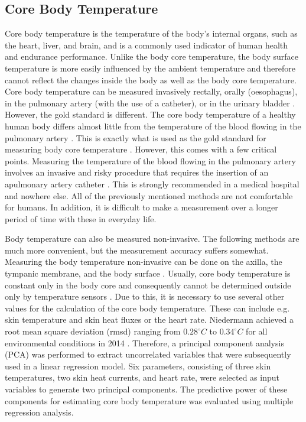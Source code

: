 \subsection{Core Body Temperature}
\label{Background:BodyTemperature:CBT}
Core body temperature is the temperature of the body's internal organs, such as the heart, liver, and brain, and is a commonly used indicator of human health and endurance performance.
Unlike the body core temperature, the body surface temperature is more easily influenced by the ambient temperature and therefore cannot reflect the changes inside the body as well as the body core temperature.
Core body temperature can be measured invasively rectally, orally (oesophagus), in the pulmonary artery (with the use of a catheter), or in the urinary bladder \cite{moranCoreTemperatureMeasurement2002a}.
However, the gold standard is different.
The core body temperature of a healthy human body differs almost little from the temperature of the blood flowing in the pulmonary artery \cite{krizanacFemoroiliacalArteryPulmonary2013, holtzclawMonitoringBodyTemperature1993}.
This is exactly what is used as the gold standard for measuring body core temperature \cite{krizanacFemoroiliacalArteryPulmonary2013, holtzclawMonitoringBodyTemperature1993, fulbrookCoreBodyTemperature1997, maxtonEstimatingCoreTemperature2004}.
However, this comes with a few critical points.
Measuring the temperature of the blood flowing in the pulmonary artery involves an invasive and risky procedure that requires the insertion of an apulmonary artery catheter \cite{yeohRevisitingTympanicMembrane2017}.
This is strongly recommended in a medical hospital and nowhere else.
All of the previously mentioned methods are not comfortable for humans. 
In addition, it is difficult to make a measurement over a longer period of time with these in everyday life.

Body temperature can also be measured non-invasive.
The following methods are much more convenient, but the measurement accuracy suffers somewhat.
Measuring the body temperature non-invasive can be done on the axilla, the tympanic membrane, and the body surface \cite{moranCoreTemperatureMeasurement2002a}.
Usually, core body temperature is constant only in the body core and consequently cannot be determined outside only by temperature sensors \cite{niedermannPredictionHumanCore2014}.
Due to this, it is necessary to use several other values for the calculation of the core body temperature. 
These can include e.g. skin temperature and skin heat fluxes or the heart rate.
Niedermann achieved a root mean square deviation (rmsd) ranging from $0.28 ^\circ C$ to $0.34 ^\circ C$ for all environmental conditions in 2014 \cite{niedermannPredictionHumanCore2014}.
Therefore, a principal component analysis (PCA) was performed to extract uncorrelated variables that were subsequently used in a linear regression model. 
Six parameters, consisting of three skin temperatures, two skin heat currents, and heart rate, were selected as input variables to generate two principal components. 
The predictive power of these components for estimating core body temperature was evaluated using multiple regression analysis.

